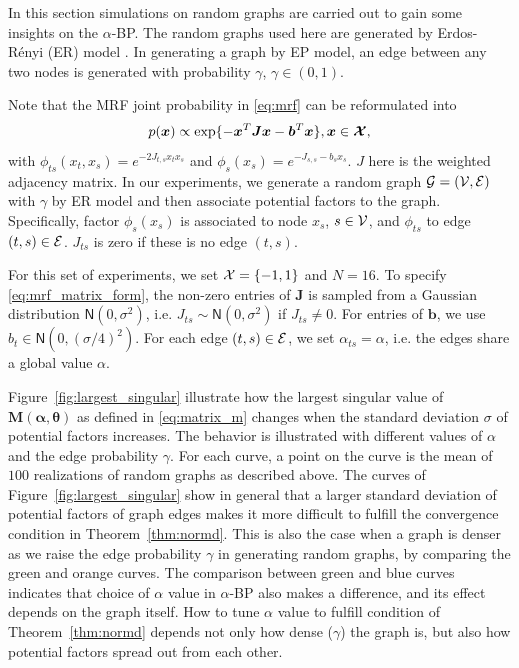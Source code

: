 In this section simulations on random graphs are carried out
to gain some insights on the $\alpha$-BP. The random graphs used here are generated
by Erdos-R\'enyi (ER) model \cite{erdos1960}. In generating a graph by EP model, an edge between any two nodes is generated with probability $\gamma$, $\gamma \in (0,1)$.

Note that the MRF joint probability in \eqref{eq:mrf} can be reformulated into
\begin{equation}\label{eq:mrf_matrix_form}
  p(\bm{x}) \propto \exp\{-\bm{x}^{T}\bm{J}\bm{x} - \bm{b}^{T}\bm{x}\}, \bm{x} \in \bm{\mathcal{X}},
\end{equation}
with $\phi_{ts}(x_t, x_s) = e^{- 2 J_{t,s} x_t x_s}$ and $\phi_s(x_s) = e^{ - J_{s,s} - b_s  x_s}$. $J$ here is the weighted adjacency matrix. In our experiments, we generate a random graph $\mathcal{G} = (\mathcal{V}, \mathcal{E})$ with $\gamma$ by ER model and then associate potential factors to the graph. Specifically, factor $\phi_s(x_s)$ is associated to node $x_s$, $s \in \mathcal{V}$, and $\phi_{ts}$ to edge $(t, s) \in \mathcal{E}$. $J_{ts}$ is zero if these is no edge $(t, s)$.

For this set of experiments, we set $\mathcal{X} = \left\{ -1, 1 \right\}$ and $N=16$. To specify \eqref{eq:mrf_matrix_form}, the non-zero entries of $\bm{J}$ is sampled from a Gaussian distribution $\mathsf{N}(0, \sigma^2)$, i.e. $J_{ts} \sim \mathsf{N}(0, \sigma^2)$ if $J_{ts}\neq 0$. For entries of $\bm{b}$, we use $b_t \in \mathsf{N}(0, (\sigma/4)^2)$.
For each edge $(t,s) \in \mathcal{E}$, we set $\alpha_{ts}=\alpha$, i.e. the edges share a global value $\alpha$.

Figure~\ref{fig:largest_singular} illustrate how the largest singular value of $\bm{M}(\bm{\alpha}, \bm{\theta})$ as defined in \eqref{eq:matrix_m} changes when the standard deviation $\sigma$ of potential factors increases. The behavior is illustrated with different values of $\alpha$ and the edge probability $\gamma$. For each curve, a point on the curve is the mean of $100$ realizations of random graphs as described above. The curves of Figure~\ref{fig:largest_singular} show in general that a larger standard deviation of potential factors of graph edges makes it more difficult to fulfill the convergence condition in Theorem~\ref{thm:normd}. This is also the case when a graph is denser as we raise the edge probability $\gamma$ in generating random graphs, by comparing the green and orange curves. The comparison between green and blue curves indicates that choice of $\alpha$ value in $\alpha$-BP also makes a difference, and its effect depends on the graph itself. How to tune $\alpha$ value to fulfill condition of Theorem~\ref{thm:normd} depends not only how dense ($\gamma$) the graph is, but also how potential factors spread out from each other.

